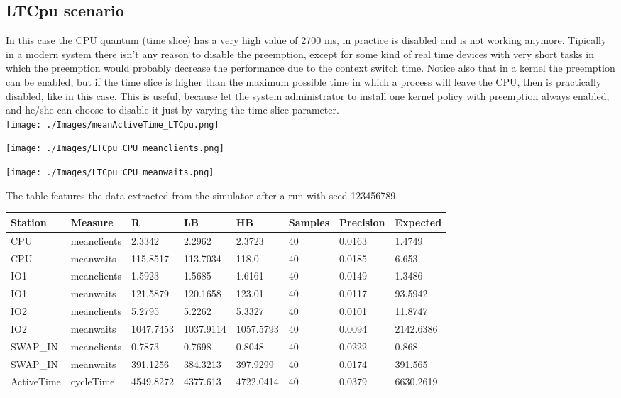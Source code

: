 \documentclass[12pt,a4paper]{article}
\begin{document}
\subsection{LTCpu scenario}

In this case the CPU quantum (time slice) has a very high value of 2700 ms, in practice is disabled and is not working anymore. Tipically in a modern system there isn't any reason to disable the preemption, except for some kind of real time devices with very short tasks in which the preemption would probably decrease the performance due to the context switch time. Notice also that in a kernel the preemption can be enabled, but if the time slice is higher than the maximum possible time in which a process will leave the CPU, then is practically disabled, like in this case. This is useful, because let the system administrator to install one kernel policy with preemption always enabled, and he/she can choose to disable it just by varying the time slice parameter. 
\\

\texttt{[image: ./Images/meanActiveTime\_LTCpu.png]}


\texttt{[image: ./Images/LTCpu\_CPU\_meanclients.png]}


\texttt{[image: ./Images/LTCpu\_CPU\_meanwaits.png]}

The table features the data extracted from the simulator after a run with seed 123456789.


\begin{table}[!ht]
    \centering
    \begin{tabular}{|l|l|l|l|l|l|l|l|}
    \hline
    Station & Measure & R & LB & HB & Samples & Precision & Expected \\ \hline
    CPU & meanclients & 2.3342 & 2.2962 & 2.3723 & 40 & 0.0163 & 1.4749 \\ \hline
    CPU & meanwaits & 115.8517 & 113.7034 & 118.0 & 40 & 0.0185 & 6.653 \\ \hline
    IO1 & meanclients & 1.5923 & 1.5685 & 1.6161 & 40 & 0.0149 & 1.3486 \\ \hline
    IO1 & meanwaits & 121.5879 & 120.1658 & 123.01 & 40 & 0.0117 & 93.5942 \\ \hline
    IO2 & meanclients & 5.2795 & 5.2262 & 5.3327 & 40 & 0.0101 & 11.8747 \\ \hline
    IO2 & meanwaits & 1047.7453 & 1037.9114 & 1057.5793 & 40 & 0.0094 & 2142.6386 \\ \hline
    SWAP\_IN & meanclients & 0.7873 & 0.7698 & 0.8048 & 40 & 0.0222 & 0.868 \\ \hline
    SWAP\_IN & meanwaits & 391.1256 & 384.3213 & 397.9299 & 40 & 0.0174 & 391.565 \\ \hline
    ActiveTime & cycleTime & 4549.8272 & 4377.613 & 4722.0414 & 40 & 0.0379 & 6630.2619 \\ \hline
    \end{tabular}
\end{table}
\end{document}
